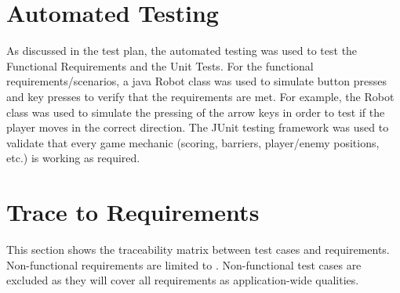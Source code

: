 \documentclass[12pt, titlepage]{article}
\begin{document}
\section{Automated Testing}

As discussed in the test plan, the automated testing was used to test the Functional Requirements and the Unit Tests. For the functional requirements/scenarios, a java Robot class was used to simulate button presses and key presses to verify that the requirements are met. For example, the Robot class was used to simulate the pressing of the arrow keys in order to test if the player moves in the correct direction. The JUnit testing framework was used to validate that every game mechanic (scoring, barriers, player/enemy positions, etc.) is working as required.
		
\section{Trace to Requirements}
This section shows the traceability matrix between test cases and requirements. Non-functional requirements are limited to . Non-functional test cases are excluded as they will cover all requirements as application-wide qualities.
\end{document}
